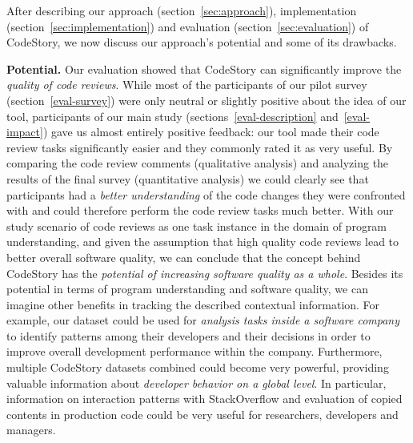 \documentclass[../manifest.tex]{subfiles}
\begin{document}
After describing our approach (section~\ref{sec:approach}), implementation (section~\ref{sec:implementation}) and evaluation (section~\ref{sec:evaluation}) of CodeStory, we now discuss our approach's potential and some of its drawbacks.

\textbf{Potential.}
Our evaluation showed that CodeStory can significantly improve the \textit{quality of code reviews}. While most of the participants of our pilot survey (section~\ref{eval-survey}) were only neutral or slightly positive about the idea of our tool, participants of our main study (sections~\ref{eval-description} and~\ref{eval-impact}) gave us almost entirely positive feedback: our tool made their code review tasks significantly easier and they commonly rated it as very useful. By comparing the code review comments (qualitative analysis) and analyzing the results of the final survey (quantitative analysis) we could clearly see that participants had a \textit{better understanding} of the code changes they were confronted with and could therefore perform the code review tasks much better. With our study scenario of code reviews as one task instance in the domain of program understanding, and given the assumption that high quality code reviews lead to better overall software quality, we can conclude that the concept behind CodeStory has the \textit{potential of increasing software quality as a whole}. Besides its potential in terms of program understanding and software quality, we can imagine other benefits in tracking the described contextual information. For example, our dataset could be used for \textit{analysis tasks inside a software company} to identify patterns among their developers and their decisions in order to improve overall development performance within the company. Furthermore, multiple CodeStory datasets combined could become very powerful, providing valuable information about \textit{developer behavior on a global level}. In particular, information on interaction patterns with StackOverflow and evaluation of copied contents in production code could be very useful for researchers, developers and managers.
\end{document}
